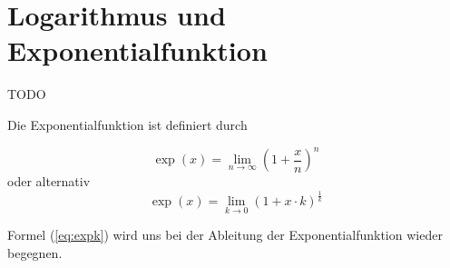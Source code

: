 
\chapter{Logarithmus und Exponentialfunktion}

TODO


\begin{definition}
Die Exponentialfunktion ist definiert durch

\begin{equation}\label{eq:expn}
\exp(x) = \lim_{n\rightarrow \infty} \left( 1+\frac{x}{n} \right)^n
\end{equation}
oder alternativ
\begin{equation}\label{eq:expk}
\exp(x) = \lim_{k\rightarrow 0} \left( 1+x\cdot k \right)^{\frac{1}{k}}
\end{equation}
\end{definition}

Formel (\ref{eq:expk}) wird uns bei der Ableitung der Exponentialfunktion wieder begegnen.

